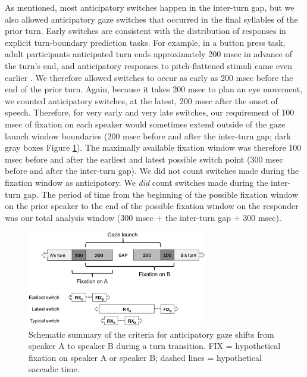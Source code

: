 \documentclass[authoryear, 12pt]{elsarticle}
\begin{document}
As mentioned, most anticipatory switches happen in the inter-turn gap, but we also allowed anticipatory gaze switches that occurred in the final syllables of the prior turn. Early switches are consistent with the distribution of responses in explicit turn-boundary prediction tasks. For example, in a button press task, adult participants anticipated turn ends approximately 200 msec in advance of the turn's end, and anticipatory responses to pitch-flattened stimuli came even earlier \citep{de-ruiter2006}. We therefore allowed switches to occur as early as 200 msec before the end of the prior turn. Again, because it takes 200 msec to plan an eye movement, we counted anticipatory switches, at the latest, 200 msec after the onset of speech. Therefore, for very early and very late switches, our requirement of 100 msec of fixation on each speaker would sometimes extend outside of the gaze launch window boundaries (200 msec before and after the inter-turn gap; dark gray boxes Figure \ref{fig:criterion}). The maximally available fixation window was therefore 100 msec before and after the earliest and latest possible switch point (300 msec before and after the inter-turn gap). We did not count switches made during the fixation window as anticipatory. We \textit{did} count switches made during the inter-turn gap. The period of time from the beginning of the possible fixation window on the prior speaker to the end of the possible fixation window on the responder was our total analysis window (300 msec $+$ the inter-turn gap $+$ 300 msec).

\begin{figure}[t]
\begin{center}
\includegraphics[width=0.7\textwidth]{figures/FIG-AnticipCriteria.png}
\end{center}
\caption{Schematic summary of the criteria for anticipatory gaze shifts from speaker A to speaker B during a turn transition. FIX = hypothetical fixation on speaker A or speaker B; dashed lines = hypothetical saccadic time.}
\label{fig:criterion}
\end{figure}
\end{document}

